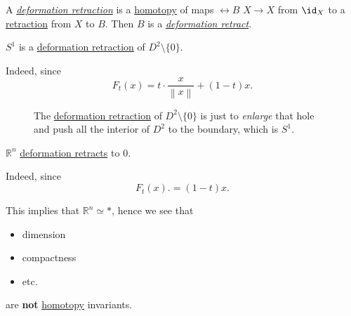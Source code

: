 \begin{prev}
	A \hyperref[def:deformation-retraction]{\emph{deformation retraction}} is a \hyperref[def:homotopy]{homotopy} of maps \(\rel B\) \(X\to X\) from \(\id_X\) to a \hyperref[def:retraction]{retraction} from \(X\) to \(B\). Then \(B\) is a \hyperref[def:deformation-retraction]{\emph{deformation retract}}.
\end{prev}

\begin{eg}
	\(S^1\) is a \hyperref[def:deformation-retraction]{deformation retraction} of \(D^{2}\setminus \{0\}\).
\end{eg}
\begin{explanation}
	Indeed, since
	\[
		F_t(x) = t\cdot \frac{x}{\left\lVert x\right\rVert } + (1 - t)x.
	\]
	\begin{figure}[H]
		\centering
		\caption{The \hyperref[def:deformation-retraction]{deformation retraction} of \(D^{2}\setminus \{0\}\) is just to \emph{enlarge} that hole and push all the interior of \(D^2\) to the boundary, which is \(S^1\).}
		\label{fig:eg:punched-circle}
	\end{figure}
\end{explanation}

\begin{eg}
	\(\mathbb{R} ^n\) \hyperref[def:deformation-retraction]{deformation retracts} to \(0\).
\end{eg}
\begin{explanation}
	Indeed, since
	\[
		F_t(x). = (1 - t)x.
	\]
	\begin{remark}
		This implies that \(\mathbb{R} ^n\simeq *\), hence we see that
		\begin{itemize}
			\item dimension
			\item compactness
			\item etc.
		\end{itemize}
		are \textbf{not} \hyperref[def:homotopy]{homotopy} invariants.
	\end{remark}
\end{explanation}

